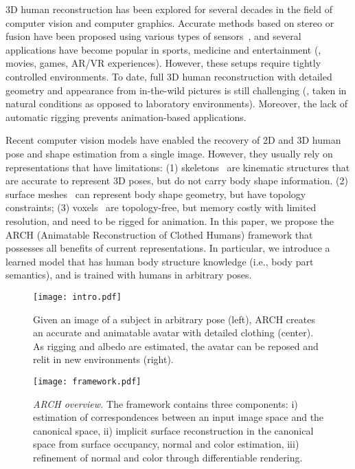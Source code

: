 \documentclass[10pt,twocolumn,letterpaper]{article}
\newcommand{\beforefigcaption}{\vspace{-4mm}}
\newcommand{\afterfigcaption}{\vspace{-4mm}}
\begin{document}
3D human reconstruction has been explored for several decades in the field of computer vision and computer graphics.
Accurate methods based on stereo or fusion have been proposed using various types of sensors~\cite{furukawa07,tung09,tung12,newcombe15,xu2018scene,xu2016multi,xu2017multi}, and several applications have become popular in sports, medicine and entertainment (\eg, movies, games, AR/VR experiences).
However, these setups require tightly controlled environments.
To date, full 3D human reconstruction with detailed geometry and appearance
from in-the-wild pictures is still challenging (\ie, taken in natural conditions as opposed to laboratory environments).
Moreover, the lack of automatic rigging prevents animation-based applications.



Recent computer vision models have enabled the recovery of  2D and 3D human pose and shape estimation from a single image. However, they usually rely on representations that have limitations: (1) skeletons~\cite{Fang2018PoseGrammar} are kinematic structures that are accurate to represent 3D poses, but do not carry body shape information. (2) surface meshes~\cite{kanazawa2018hmr,NeuralBodyFit18,DenseRaCICCV19} can represent body shape geometry, but have topology constraints; (3) voxels~\cite{varol18_bodynet} are topology-free, but memory costly with limited resolution, and need to be rigged for animation.
In this paper, we propose the ARCH (Animatable Reconstruction of Clothed Humans) framework
that possesses all benefits of current representations. In particular, we introduce a learned model that has human body structure knowledge (i.e., body part semantics), and is trained with humans in arbitrary poses.


\begin{figure}[ptb]
\centering
\texttt{[image: intro.pdf]}
\beforefigcaption
\caption{Given an image of a subject in arbitrary pose (left), ARCH creates an accurate and animatable avatar with detailed clothing (center). As rigging and albedo are estimated, the avatar can be reposed and relit in new environments (right).}
\afterfigcaption
\vspace{-2mm}
\label{fig:intro}
\end{figure}



\begin{figure*}[ptb]
\centering
\texttt{[image: framework.pdf]}
\beforefigcaption
\caption{\emph{ARCH overview.} The framework contains three components: i) estimation of correspondences between an input image space and the canonical space, ii) implicit surface reconstruction in the canonical space from surface occupancy, normal and color estimation, iii) refinement of normal and color through differentiable rendering.}
\afterfigcaption
\label{fig:framework}
\end{figure*}
\end{document}
